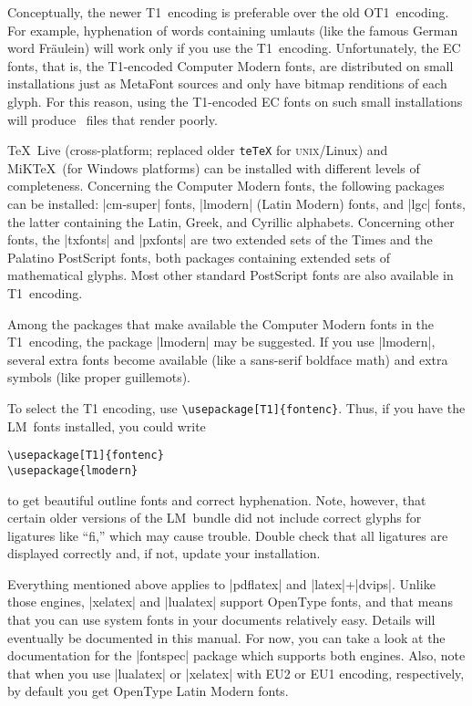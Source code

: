 Conceptually, the newer T1~encoding is preferable over the old OT1~encoding. For example, hyphenation of words containing umlauts (like the famous German word Fr\"aulein) will work only if you use the T1~encoding. Unfortunately, the EC fonts, that is, the T1-encoded Computer Modern fonts, are distributed on small installations just as MetaFont sources and only have bitmap renditions of each glyph. For this reason, using the T1-encoded EC fonts on such small installations will produce \pdf\ files that render poorly.

\TeX\ Live (cross-platform; replaced older \texttt{teTeX} for \textsc{unix}\slash Linux) and MiK\TeX\ (for Windows platforms) can be installed with different levels of completeness. Concerning the Computer Modern fonts, the following packages can be installed: |cm-super| fonts, |lmodern| (Latin Modern) fonts, and |lgc| fonts, the latter containing the Latin, Greek, and Cyrillic alphabets. Concerning other fonts, the |txfonts| and |pxfonts| are two extended sets of the Times and the Palatino PostScript fonts, both packages containing extended sets of mathematical glyphs. Most other standard PostScript fonts are also available in T1~encoding.

Among the packages that make available the Computer Modern fonts in the T1~encoding, the package |lmodern| may be suggested. If you use |lmodern|, several extra fonts become available (like a sans-serif boldface math) and extra symbols (like proper guillemots).

To select the T1 encoding, use \verb|\usepackage[T1]{fontenc}|. Thus, if you have the LM~fonts installed, you could write
\begin{verbatim}
\usepackage[T1]{fontenc}
\usepackage{lmodern}
\end{verbatim}
to get beautiful outline fonts and correct hyphenation. Note, however, that certain older versions of the LM~bundle did not include correct glyphs for ligatures like ``fi,'' which may cause trouble. Double check that all ligatures are displayed correctly and, if not, update your installation.

Everything mentioned above applies to |pdflatex| and |latex|+|dvips|. Unlike those engines, |xelatex| and |lualatex| support OpenType fonts, and that means that you can use system fonts in your documents relatively easy. Details will eventually be documented in this manual. For now, you can take a look at the documentation for the |fontspec| package which supports both engines. Also, note that when you use |lualatex| or |xelatex| with EU2 or EU1 encoding, respectively, by default you get OpenType Latin Modern fonts.



